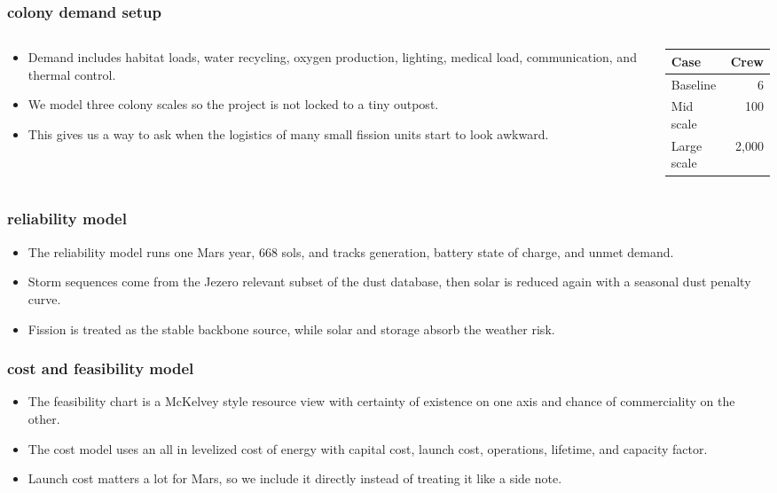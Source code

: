 \documentclass[11pt, xcolor={dvipsnames}, usepdftitle=false]{beamer}
\begin{document}
\begin{frame}
\frametitle{colony demand setup}
\begin{columns}[T]
\begin{column}{0.56\textwidth}
\begin{itemize}
\item Demand includes habitat loads, water recycling, oxygen production, lighting, medical load, communication, and thermal control.
\item We model three colony scales so the project is not locked to a tiny outpost.
\item This gives us a way to ask when the logistics of many small fission units start to look awkward.
\end{itemize}
\end{column}
\begin{column}{0.40\textwidth}
\small
\begin{tabular}{lr}
\toprule
Case & Crew \\
\midrule
Baseline & 6 \\
Mid scale & 100 \\
Large scale & 2{,}000 \\
\bottomrule
\end{tabular}
\end{column}
\end{columns}
\end{frame}

\begin{frame}
\frametitle{reliability model}
\begin{itemize}
\item The reliability model runs one Mars year, 668 sols, and tracks generation, battery state of charge, and unmet demand.
\item Storm sequences come from the Jezero relevant subset of the dust database, then solar is reduced again with a seasonal dust penalty curve.
\item Fission is treated as the stable backbone source, while solar and storage absorb the weather risk.
\end{itemize}
\end{frame}

\begin{frame}
\frametitle{cost and feasibility model}
\begin{itemize}
\item The feasibility chart is a McKelvey style resource view with certainty of existence on one axis and chance of commerciality on the other.
\item The cost model uses an all in levelized cost of energy with capital cost, launch cost, operations, lifetime, and capacity factor.
\item Launch cost matters a lot for Mars, so we include it directly instead of treating it like a side note.
\end{itemize}
\end{frame}
\end{document}
